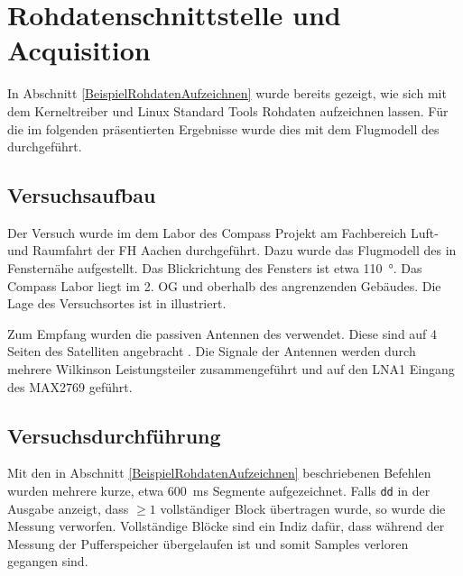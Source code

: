 \section{Rohdatenschnittstelle und Acquisition}
In Abschnitt \ref{BeispielRohdatenAufzeichnen} wurde bereits gezeigt, wie sich mit dem Kerneltreiber und Linux Standard Tools Rohdaten aufzeichnen lassen. Für die im folgenden präsentierten Ergebnisse wurde dies mit dem Flugmodell des \dscubesat durchgeführt.

\subsection{Versuchsaufbau}
Der Versuch wurde im dem Labor des Compass Projekt am Fachbereich Luft- und Raumfahrt der FH Aachen durchgeführt. Dazu wurde das Flugmodell des \dscubesat in Fensternähe aufgestellt. Das Blickrichtung des Fensters ist etwa \SI{110}{\degree}. Das Compass Labor liegt im 2. OG und oberhalb des angrenzenden Gebäudes. Die Lage des Versuchsortes ist in  illustriert.

Zum Empfang wurden die passiven Antennen des \dscubesat verwendet. Diese sind auf 4 Seiten des Satelliten angebracht . Die Signale der Antennen werden durch mehrere Wilkinson Leistungsteiler zusammengeführt und auf den LNA1 Eingang des MAX2769 geführt.



\subsection{Versuchsdurchführung}
Mit den in Abschnitt \ref{BeispielRohdatenAufzeichnen} beschriebenen Befehlen wurden mehrere kurze, etwa \SI{600}{\milli\second} Segmente aufgezeichnet. Falls \lstinline$dd$ in der Ausgabe anzeigt, dass $\geq 1$ vollständiger Block übertragen wurde, so wurde die Messung verworfen. Vollständige Blöcke sind ein Indiz dafür, dass während der Messung der Pufferspeicher übergelaufen ist und somit Samples verloren gegangen sind.


